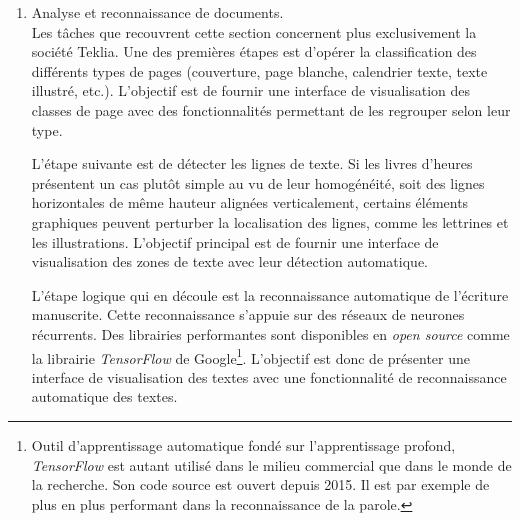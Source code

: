 \documentclass[a4paper,12pt,twoside]{book}
\begin{document}
\begin{enumerate}
	    La troisième sous-étape concerne des problématiques plus amplement abordées lors du stage : le modèle de données et l'unicité du format afin de garantir l'interopérabilité. Si l'affichage des manuscrits se fait selon le protocole IIIF, leur texte est encodé selon un modèle bien précis respectant la TEI, soit un schéma défini dans un document ODD comme nous l'avons présenté pour l'encodage des métadonnées, en l'occurrence des notices de livres d'heures conservées à la BnF. 
	    
	    La dernière sous-étape est la publication d'une interface graphique afin de saisir, visualiser et corriger les données si nécessaire, affiner la table de structure et les textes de référence\footcite[p. 11-13]{HORAE_projet}. On peut par exemple penser au mode auteur du logiciel Oxygen XML Editor qui permet de voir et modifier les données affichées de manière plus claire et limpide, sans balises, avec une présentation personnalisable grâce à la modification de la CSS et des frameworks du logiciel\footnote{Des tests de personnalisation de la CSS et des frameworks d'Oxygen sont disponibles dans les livrables techniques.}.\\ 
	    
	    \item \og Analyse et reconnaissance de documents\fg{}. \\
	    
	    Les tâches que recouvrent cette section concernent plus exclusivement la société Teklia. Une des premières étapes est d'opérer la classification des différents types de pages (couverture, page blanche, calendrier texte, texte illustré, etc.). L'objectif est de fournir une interface de visualisation des classes de page avec des fonctionnalités permettant de les regrouper selon leur type. 
	    
	    L'étape suivante est de détecter les lignes de texte. Si les livres d'heures présentent un cas plutôt simple au vu de leur homogénéité, soit des lignes horizontales de même hauteur alignées verticalement, certains éléments graphiques peuvent perturber la localisation des lignes, comme les lettrines et les illustrations. L'objectif principal est de fournir une interface de visualisation des zones de texte avec leur détection automatique. 
	    
	    L'étape logique qui en découle est la reconnaissance automatique de l'écriture manuscrite. Cette reconnaissance s'appuie sur des réseaux de neurones récurrents. Des librairies performantes sont disponibles en \textit{open source} comme la librairie \textit{TensorFlow} de Google\footnote{Outil d'apprentissage automatique fondé sur l'apprentissage profond, \textit{TensorFlow} est autant utilisé dans le milieu commercial que dans le monde de la recherche. Son code source est ouvert depuis 2015. Il est par exemple de plus en plus performant dans la reconnaissance de la parole.}. L'objectif est donc de présenter une interface de visualisation des textes avec une fonctionnalité de reconnaissance automatique des textes. 
	    

\end{enumerate}
\end{document}
